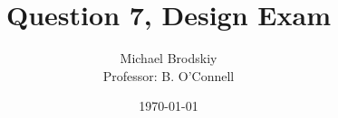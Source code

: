 


\title{Question 7, Design Exam}
\date{\today}
\author{Michael Brodskiy\\ \small Professor: B. O'Connell}



\maketitle

